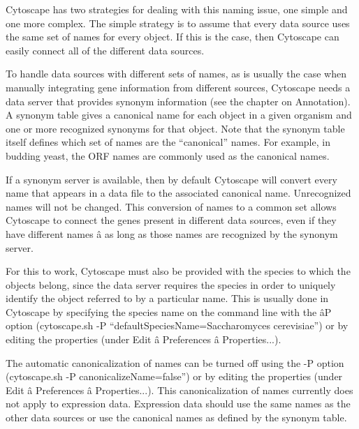  Cytoscape has two strategies for dealing with this naming issue, one simple and one more complex. The simple strategy is to assume that every data source uses the same set of names for every object. If this is the case, then Cytoscape can easily connect all of the different data sources. 


 To handle data sources with different sets of names, as is usually the case when manually integrating gene information from different sources, Cytoscape needs a data server that provides synonym information (see the chapter on Annotation). A synonym table gives a canonical name for each object in a given organism and one or more recognized synonyms for that object. Note that the synonym table itself defines which set of names are the ``canonical'' names. For example, in budding yeast, the ORF names are commonly used as the canonical names. 


 If a synonym server is available, then by default Cytoscape will convert every name that appears in a data file to the associated canonical name. Unrecognized names will not be changed. This conversion of names to a common set allows Cytoscape to connect the genes present in different data sources, even if they have different names \^a as long as those names are recognized by the synonym server. 


 For this to work, Cytoscape must also be provided with the species to which the objects belong, since the data server requires the species in order to uniquely identify the object referred to by a particular name. This is usually done in Cytoscape by specifying the species name on the command line with the \^aP option (cytoscape.sh -P ``defaultSpeciesName=Saccharomyces cerevisiae'') or by editing the properties (under Edit \^a Preferences \^a Properties...). 

 The automatic canonicalization of names can be turned off using the -P option (cytoscape.sh -P canonicalizeName=false'') or by editing the properties (under Edit \^a Preferences \^a Properties...). This canonicalization of names currently does not apply to expression data. Expression data should use the same names as the other data sources or use the canonical names as defined by the synonym table. 
